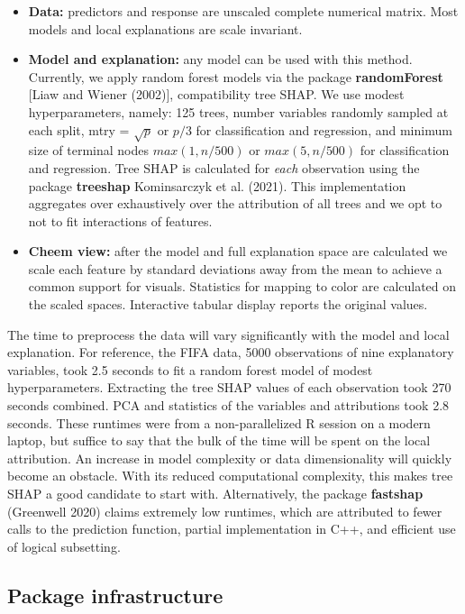 \documentclass[
]{article}
\begin{document}
\begin{itemize}
    \item \textbf{Data:} predictors and response are unscaled complete numerical matrix. Most models and local explanations are scale invariant.
    \item \textbf{Model and explanation:} any model can be used with this method. Currently, we apply random forest models via the package \textbf{randomForest} [Liaw and Wiener (2002)], compatibility tree SHAP. We use modest hyperparameters, namely: 125 trees, number variables randomly sampled at each split, mtry = $\sqrt{p}$ or $p/3$ for classification and regression, and minimum size of terminal nodes $max(1, n/500)$ or $max(5, n/500)$ for classification and regression. Tree SHAP is calculated for \emph{each} observation using the package \textbf{treeshap} Kominsarczyk et al. (2021). This implementation aggregates over exhaustively over the attribution of all trees and we opt to not to fit interactions of features. 
    \item \textbf{Cheem view:} after the model and full explanation space are calculated we scale each feature by standard deviations away from the mean to achieve a common support for visuals. Statistics for mapping to color are calculated on the scaled spaces. Interactive tabular display reports the original values.
\end{itemize}

The time to preprocess the data will vary significantly with the model and local explanation. For reference, the FIFA data, 5000 observations of nine explanatory variables, took 2.5 seconds to fit a random forest model of modest hyperparameters. Extracting the tree SHAP values of each observation took 270 seconds combined. PCA and statistics of the variables and attributions took 2.8 seconds. These runtimes were from a non-parallelized R session on a modern laptop, but suffice to say that the bulk of the time will be spent on the local attribution. An increase in model complexity or data dimensionality will quickly become an obstacle. With its reduced computational complexity, this makes tree SHAP a good candidate to start with. Alternatively, the package \textbf{fastshap} (Greenwell 2020) claims extremely low runtimes, which are attributed to fewer calls to the prediction function, partial implementation in C++, and efficient use of logical subsetting.

\hypertarget{sec:infrastructure}{%
\subsection{Package infrastructure}\label{sec:infrastructure}}
\end{document}

